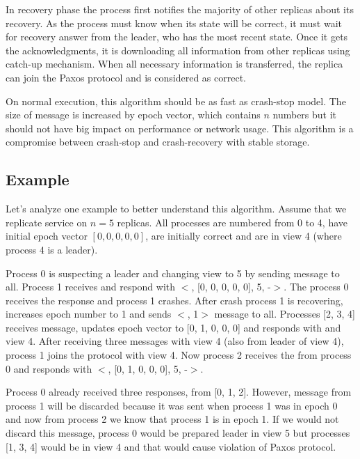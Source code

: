 In recovery phase the process first notifies the majority of other replicas about its recovery. As the process must know when its state will be correct, it must wait for recovery answer from the leader, who has the most recent state. Once it gets the acknowledgments, it is downloading all information from other replicas using catch-up mechanism.  When all necessary information is transferred, the replica can join the Paxos protocol and is considered as correct.

On normal execution, this algorithm should be as fast as crash-stop model. \linebreak The size of \prepareOK message is increased by epoch vector, which contains $n$ numbers but it should not have big impact on performance or network usage. This algorithm is a compromise between crash-stop and crash-recovery with stable storage.  

\subsection*{Example}

Let's analyze one example to better understand this algorithm. Assume that we replicate service on $n = 5$ replicas. All processes are numbered from 0 to 4, have initial epoch vector $[0, 0, 0, 0, 0]$, are initially correct and are in view 4 (where process 4 is a leader).

Process 0 is suspecting a leader and changing view to 5 by sending \prepare message to all. Process 1 receives \prepare and respond with $<$\prepareOK[], [0, 0, 0, 0, 0], 5, -$>$. The process 0 receives the response and process 1 crashes. After crash process 1 is recovering, increases epoch number to 1 and sends $<$\recovery[], 1$>$ message to all. Processes [2, 3, 4] receives \recovery message, updates epoch vector to [0, 1, 0, 0, 0] and responds with \recoveryAnswer and view 4. After receiving three \recoveryAnswer messages with view 4 (also from leader of view 4), process 1 joins the protocol with view 4. Now process 2 receives the \prepare from process 0 and responds with $<$\prepareOK[], [0, 1, 0, 0, 0], 5, -$>$.

Process 0 already received three \prepareOK responses, from [0, 1, 2]. However, message from process 1 will be discarded because it was sent when process 1 was in epoch 0 and now from process 2 we know that process 1 is in epoch 1. If we would not discard this message, process 0 would be prepared leader in view 5 but processes [1, 3, 4] would be in view 4 and that would cause violation of Paxos protocol.


